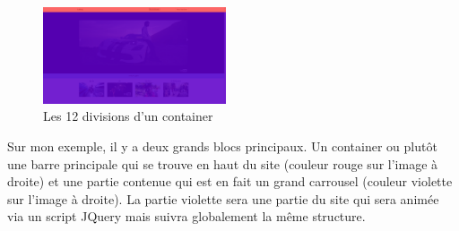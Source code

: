 \documentclass{article}
\begin{document}
\begin{figure}
  \vspace{-25pt}
  \begin{center}
    \includegraphics[width=0.48\textwidth]{p18}
  \end{center}
  \vspace{-20pt}
  \caption{Les 12 divisions d'un container}
  \vspace{-10pt}
\end{figure} 

Sur mon exemple, il y a deux grands blocs principaux. Un container ou plut\^ot une barre principale qui se trouve en haut du site (couleur rouge sur l'image \`a droite) et une partie contenue qui est en fait un grand carrousel (couleur violette sur l'image \`a droite). La partie violette sera une partie du site qui sera anim\'ee via un script JQuery mais suivra globalement la m\^eme structure.\\
\end{document}
